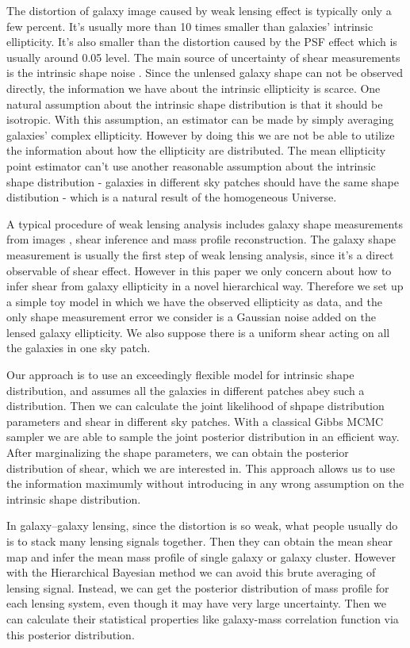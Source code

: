 \documentclass[useAMS,usenatbib]{mn2e}
\begin{document}
The distortion of galaxy image caused by weak lensing effect is typically only a few percent.
It's usually more than 10 times smaller than galaxies' intrinsic ellipticity. It's also smaller than the distortion caused
by the PSF effect which is usually around 0.05 level. The main source of uncertainty of shear measurements is the intrinsic shape noise
. Since the unlensed galaxy shape can not be observed directly, the information
we have about the intrinsic ellipticity is scarce. One natural assumption about the intrinsic shape distribution is that 
it should be isotropic. With this assumption, an estimator can be made by simply averaging galaxies' complex
ellipticity. However by doing this we are not be able to utilize the
information about how the ellipticity are distributed. The mean ellipticity
point estimator can't use another reasonable assumption about the intrinsic shape distribution - galaxies in different sky patches should have
the same shape distibution - which is a natural result of the homogeneous Universe.

A typical procedure of weak lensing analysis  includes galaxy shape measurements from images
, shear inference and mass profile reconstruction. The galaxy shape measurement is usually the
first step of weak lensing analysis, since it's a direct observable of shear effect. However
in this paper we only concern about how to infer shear from galaxy
ellipticity in a novel hierarchical way. Therefore we set up a simple toy model in which we have the observed ellipticity as
data, and the only shape measurement error we consider is a Gaussian noise
added on the lensed galaxy ellipticity. We also suppose there is a uniform shear
acting on all the galaxies in one sky patch.

Our approach is to use an exceedingly flexible model for intrinsic
shape distribution, and assumes all the galaxies in different patches
abey such a distribution. Then we can calculate the joint likelihood
of shpape distribution parameters and shear in different sky patches. With
a classical Gibbs MCMC sampler we are able to sample the joint posterior distribution
in an efficient way. After marginalizing the shape parameters, we can obtain
the posterior distribution of shear, which we are interested in. This
approach allows us to use the information maximumly without introducing
in any wrong assumption on the intrinsic shape distribution.

In galaxy--galaxy lensing, since the distortion is so weak, what people
usually do is to stack many lensing signals together. Then they can obtain the mean
shear map and infer the mean mass profile of single galaxy or galaxy
cluster. However with the Hierarchical Bayesian method we can avoid this brute averaging
of lensing signal. Instead, we can get the posterior distribution of mass profile for
each lensing system, even though it may have very large uncertainty. Then we
can calculate their statistical properties like galaxy-mass correlation
function via this posterior distribution.
\end{document}
